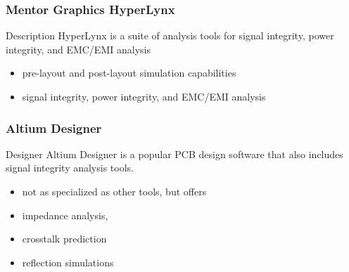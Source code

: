 \documentclass[10pt,hyperref={pdfpagemode=FullScreen},aspectratio=169]{beamer}
\begin{document}
\begin{frame}
  \frametitle{Mentor Graphics HyperLynx}
\begin{block}{Description}
  HyperLynx is a suite of analysis tools for signal integrity, power integrity, and EMC/EMI analysis
\end{block}
  
\begin{itemize}
  \item  pre-layout and post-layout simulation capabilities
  \item signal integrity, power integrity, and EMC/EMI analysis
\end{itemize}

\end{frame}

\begin{frame}
  \frametitle{Altium Designer}

  \begin{block}{Designer}
    Altium Designer is a popular PCB design software that also includes signal integrity analysis tools.
  \end{block}

  \begin{itemize}
    \item not as specialized as other tools, but offers 
    \item impedance analysis, \item crosstalk prediction
    \item reflection simulations
  \end{itemize}

  

\end{frame}
\end{document}

